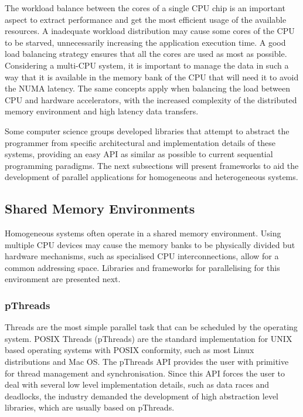 The workload balance between the cores of a single CPU chip is an important aspect to extract performance and get the most efficient usage of the available resources. A inadequate workload distribution may cause some cores of the CPU to be starved, unnecessarily increasing the application execution time. A good load balancing strategy ensures that all the cores are used as most as possible. Considering a multi-CPU system, it is important to manage the data in such a way that it is available in the memory bank of the CPU that will need it to avoid the NUMA latency. The same concepts apply when balancing the load between CPU and hardware accelerators, with the increased complexity of the distributed memory environment and high latency data transfers.

Some computer science groups developed libraries that attempt to abstract the programmer from specific architectural and implementation details of these systems, providing an easy API as similar as possible to current sequential programming paradigms. The next subsections will present frameworks to aid the development of parallel applications for homogeneous and heterogeneous systems.

\subsection{Shared Memory Environments}
\label{shared_mem}

Homogeneous systems often operate in a shared memory environment. Using multiple CPU devices may cause the memory banks to be physically divided but hardware mechanisms, such as specialised CPU interconnections, allow for a common addressing space. Libraries and frameworks for parallelising for this environment are presented next.

\subsubsection*{pThreads}

Threads are the most simple parallel task that can be scheduled by the operating system. POSIX Threads (pThreads) are the standard implementation for UNIX based operating systems with POSIX conformity, such as most Linux distributions and Mac OS. The pThreads API provides the user with primitive for thread management and synchronisation. Since this API forces the user to deal with several low level implementation details, such as data races and deadlocks, the industry demanded the development of high abstraction level libraries, which are usually based on pThreads.

